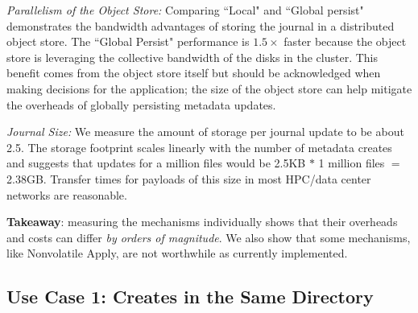 {\it Parallelism of the Object Store:} Comparing ``Local" and ``Global
persist" demonstrates the bandwidth advantages of storing the journal in a
distributed object store. The ``Global Persist"
performance is \(1.5\times\) faster because the object store is leveraging the
collective bandwidth of the disks in the cluster. This benefit comes from the
object store itself but should be acknowledged when making decisions for the
application; the size of the object store can help mitigate the overheads of
globally persisting metadata updates.

{\it Journal Size:} We measure the amount of storage per journal update to be
about 2.5. The storage footprint scales linearly with the number of
metadata creates and suggests that updates for a million files would be 2.5KB
\(*\) 1 million files \(=\) 2.38GB. Transfer times for payloads of this size in
most HPC/data center networks are reasonable.

\textbf{Takeaway}: measuring the mechanisms individually shows that their
overheads and costs can differ {\it by orders of magnitude}. We also show that
some mechanisms, like Nonvolatile Apply, are not worthwhile as currently
implemented.

\subsection{Use Case 1: Creates in the Same Directory}
\label{sec:use-case-1}

